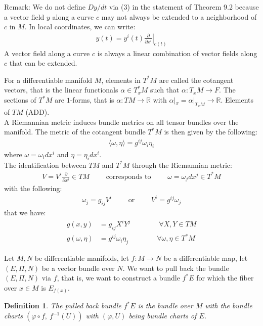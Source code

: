 \documentclass[11pt]{book}
\theoremstyle{break}
\theoremstyle{break}
\newtheorem{defn}{Definition}[corL]
\newcommand{\R}{\mathbb{R}}
\newcommand{\pd}{\partial}
\newcommand{\remark}{\color{blue}Remark: \color{black}}
\begin{document}
\remark We do not define $Dy/dt$ via (3) in the statement of Theorem 9.2 because a vector field $y$ along a curve $c$ may not always be extended to a neighborhood of $c$ in $M$. In local coordinates, we can write:
\begin{align*}
y(t) = y^i(t) \left.\frac{\pd}{\pd x^i}\right|_{c(t)}
\end{align*}
A vector field along a curve $c$ is always a linear combination of vector fields along $c$ that can be extended. 


\newpage
For a differentiable manifold $M$, elements in $T^*M$ are called the cotangent vectors, that is the linear functionals $\alpha\in T^*_xM$ such that $\alpha:T_xM \to F$. The sections of $T^*M$ are $1$-forms, that is $\alpha:TM\to \R$ with $\alpha|_x = \alpha|_{T_x{M}}\to \R$. Elements of $TM$ (ADD).\\


A Riemannian metric induces bundle metrics on all tensor bundles over the manifold. The metric of the cotangent bundle $T^*M$ is then given by the following:
\begin{align*}
\langle \omega, \eta\rangle = g^{ij}\omega_i \eta_i
\end{align*}
where $\omega = \omega_i dx^i$ and $\eta = \eta_i dx^i$.\\ 

The identification between $TM$ and $T^*M$ through the Riemannian metric:
\begin{align*}
V = V^i \frac{\pd}{\pd x^i}\in TM \qquad \text{ corresponds to }\qquad \omega = \omega_j dx^j \in T^*M
\end{align*}
with the following:
\begin{align*}
\omega_j = g_{ij}V^i \qquad\text{ or }\qquad V^i = g^{ij} \omega_j
\end{align*}
that we have:
\begin{align*}
g(x,y) &= g_{ij}X^i Y^j\qquad\qquad\forall X,Y \in TM\\
g(\omega, \eta) &= g^{ij}\omega_i \eta_j \qquad\qquad \forall \omega,\eta \in T^*M
\end{align*}



\newpage
Let $M,N$ be differentiable manifolds, let $f:M \to N$ be a differentiable map, let $(E,\Pi, N)$ be a vector bundle over $N$. We want to pull back the bundle $(E,\Pi, N)$ via $f$, that is, we want to construct a bundle $f^*E$ for which the fiber over $x \in M$ is $E_{f(x)}$. 

\begin{defn}
The pulled back bundle $f^*E$ is the bundle over $M$ with the bundle charts $\left( \varphi \circ f,\ f^{-1}(U)\right)$ with $(\varphi, U)$  being bundle charts of $E$. 
\end{defn}
\end{document}
